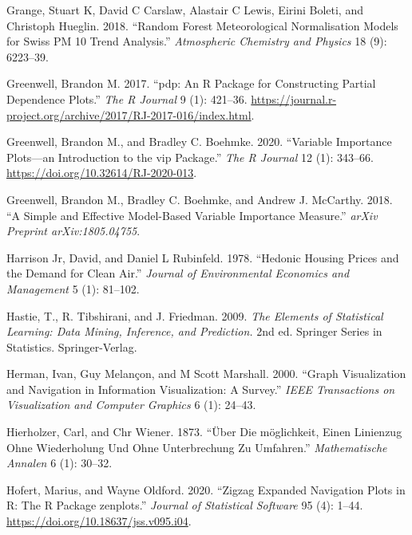 \begin{CSLReferences}{1}{0}
\leavevmode{}%
Grange, Stuart K, David C Carslaw, Alastair C Lewis, Eirini Boleti, and Christoph Hueglin. 2018. {``Random Forest Meteorological Normalisation Models for Swiss PM 10 Trend Analysis.''} \emph{Atmospheric Chemistry and Physics} 18 (9): 6223--39.

\leavevmode{}%
Greenwell, Brandon M. 2017. {``{pdp}: An {R} Package for Constructing Partial Dependence Plots.''} \emph{The R Journal} 9 (1): 421--36. \url{https://journal.r-project.org/archive/2017/RJ-2017-016/index.html}.

\leavevmode{}%
Greenwell, Brandon M., and Bradley C. Boehmke. 2020. {``Variable Importance Plots---an Introduction to the {vip} Package.''} \emph{The R Journal} 12 (1): 343--66. \url{https://doi.org/10.32614/RJ-2020-013}.

\leavevmode{}%
Greenwell, Brandon M., Bradley C. Boehmke, and Andrew J. McCarthy. 2018. {``A Simple and Effective Model-Based Variable Importance Measure.''} \emph{arXiv Preprint arXiv:1805.04755}.

\leavevmode{}%
Harrison Jr, David, and Daniel L Rubinfeld. 1978. {``Hedonic Housing Prices and the Demand for Clean Air.''} \emph{Journal of Environmental Economics and Management} 5 (1): 81--102.

\leavevmode{}%
Hastie, T., R. Tibshirani, and J. Friedman. 2009. \emph{The Elements of Statistical Learning: Data Mining, Inference, and Prediction.} 2nd ed. Springer Series in Statistics. Springer-Verlag.

\leavevmode{}%
Herman, Ivan, Guy Melançon, and M Scott Marshall. 2000. {``Graph Visualization and Navigation in Information Visualization: A Survey.''} \emph{IEEE Transactions on Visualization and Computer Graphics} 6 (1): 24--43.

\leavevmode{}%
Hierholzer, Carl, and Chr Wiener. 1873. {``{Ü}ber Die m{ö}glichkeit, Einen Linienzug Ohne Wiederholung Und Ohne Unterbrechung Zu Umfahren.''} \emph{Mathematische Annalen} 6 (1): 30--32.

\leavevmode{}%
Hofert, Marius, and Wayne Oldford. 2020. {``Zigzag Expanded Navigation Plots in {R}: The {R} Package {zenplots}.''} \emph{Journal of Statistical Software} 95 (4): 1--44. \url{https://doi.org/10.18637/jss.v095.i04}.


\end{CSLReferences}

